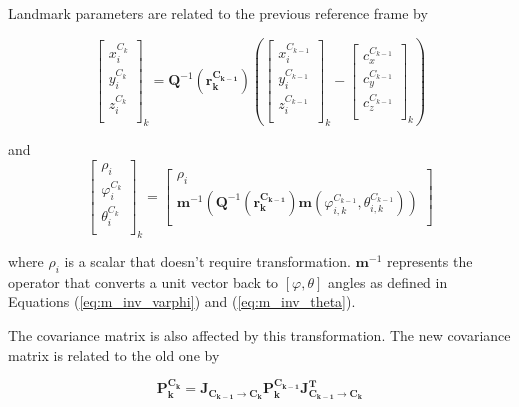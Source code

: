 Landmark parameters are related to the previous reference frame by

\begin{equation}
\begin{bmatrix}
x_{i}^{C_{k}} \\
y_{i}^{C_{k}} \\
z_{i}^{C_{k}} \\
\end{bmatrix}_{k}=\boldsymbol{Q}^{-1}(\boldsymbol{r_k^{C_{k-1}}})\left(
\begin{bmatrix}
x_{i}^{C_{k-1}} \\
y_{i}^{C_{k-1}} \\
z_{i}^{C_{k-1}} \\
\end{bmatrix}_{k}- \begin{bmatrix}
c_{x}^{C_{k-1}} \\
c_{y}^{C_{k-1}} \\
c_{z}^{C_{k-1}} \\
\end{bmatrix}_{k}\right)
\end{equation}

\noindent and
\begin{equation}
\begin{bmatrix}
\rho_{i} \\
\varphi_{i}^{C_{k}} \\
\theta_{i}^{C_{k}} \\
\end{bmatrix}_{k}=
\begin{bmatrix}
\rho _{i} \\
\boldsymbol{m}^{-1}\left(\boldsymbol{Q}^{-1}(\boldsymbol{r_k^{C_{k-1}}})\boldsymbol{m}(\varphi _{i, k}^{C_{k-1}}, \theta _{i, k}^{C_{k-1}})\right) \\
\end{bmatrix}
\end{equation}

\noindent where $\rho_i$ is a scalar that doesn't require transformation.
$\boldsymbol{m}^{-1}$ represents the operator that converts
a unit vector back to $[\varphi, \theta]$ angles as defined in
Equations (\ref{eq:m_inv_varphi}) and (\ref{eq:m_inv_theta}).

The covariance matrix is also affected by this transformation. The new
covariance matrix is related to the old one by

\begin{equation}
\boldsymbol{P_{k}^{C_{k}}}=\boldsymbol{J_{C_{k-1}\to C_{k}}}\boldsymbol{P_{k}^{C_{k-1}}}\boldsymbol{J_{C_{k-1}\to C_{k}}^{T}}
\end{equation}

